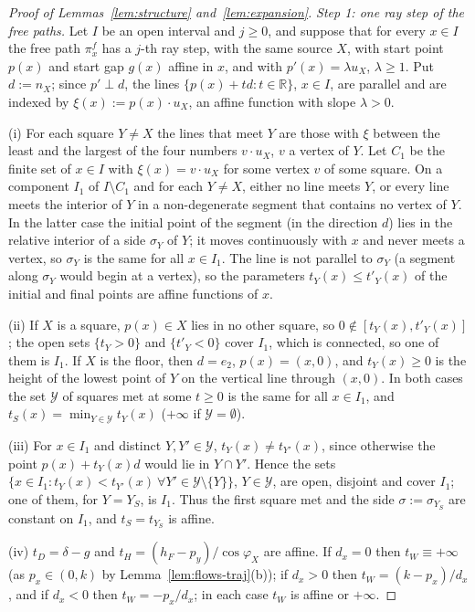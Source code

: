 \documentclass[11pt]{amsart}
\newcommand{\R}{\mathbb R}
\theoremstyle{definition}
\theoremstyle{remark}
\numberwithin{equation}{section}
\begin{document}
\begin{proof}[Proof of Lemmas~\ref{lem:structure} and~\ref{lem:expansion}]
\emph{Step 1: one ray step of the free paths.} Let $I$ be an open interval and $j\ge0$, and suppose that for every
$x\in I$ the free path $\pi^f_x$ has a $j$-th ray step, with the same source $X$, with start point $p(x)$ and start gap
$g(x)$ affine in $x$, and with $p'(x)=\lambda u_X$, $\lambda\ge1$. Put $d:=n_X$; since $p'\perp d$, the lines
$\{p(x)+td:t\in\R\}$, $x\in I$, are parallel and are indexed by $\xi(x):=p(x)\cdot u_X$, an affine function with slope
$\lambda>0$.

(i) For each square $Y\ne X$ the lines that meet $Y$ are those with $\xi$ between the least and the largest of the four
numbers $v\cdot u_X$, $v$ a vertex of $Y$. Let $C_1$ be the finite set of $x\in I$ with $\xi(x)=v\cdot u_X$ for some
vertex $v$ of some square. On a component $I_1$ of $I\setminus C_1$ and for each $Y\ne X$, either no line meets $Y$, or
every line meets the interior of $Y$ in a non-degenerate segment that contains no vertex of $Y$. In the latter case the
initial point of the segment (in the direction $d$) lies in the relative interior of a side $\sigma_Y$ of $Y$; it moves
continuously with $x$ and never meets a vertex, so $\sigma_Y$ is the same for all $x\in I_1$. The line is not parallel
to $\sigma_Y$ (a segment along $\sigma_Y$ would begin at a vertex), so the parameters $t_Y(x)\le t'_Y(x)$ of the initial
and final points are affine functions of $x$.

(ii) If $X$ is a square, $p(x)\in X$ lies in no other square, so $0\notin[t_Y(x),t'_Y(x)]$; the open sets
$\{t_Y>0\}$ and $\{t'_Y<0\}$ cover $I_1$, which is connected, so one of them is $I_1$. If $X$ is the floor, then
$d=e_2$, $p(x)=(x,0)$, and $t_Y(x)\ge0$ is the height of the lowest point of $Y$ on the vertical line through $(x,0)$.
In both cases the set $\mathcal Y$ of squares met at some $t\ge0$ is the same for all $x\in I_1$, and
$t_S(x)=\min_{Y\in\mathcal Y}t_Y(x)$ ($+\infty$ if $\mathcal Y=\emptyset$).

(iii) For $x\in I_1$ and distinct $Y,Y'\in\mathcal Y$, $t_Y(x)\ne t_{Y'}(x)$, since otherwise the point
$p(x)+t_Y(x)d$ would lie in $Y\cap Y'$. Hence the sets $\{x\in I_1:t_Y(x)<t_{Y'}(x)\ \forall Y'\in\mathcal Y\setminus\{Y\}\}$,
$Y\in\mathcal Y$, are open, disjoint and cover $I_1$; one of them, for $Y=Y_S$, is $I_1$. Thus the first square met and
the side $\sigma:=\sigma_{Y_S}$ are constant on $I_1$, and $t_S=t_{Y_S}$ is affine.

(iv) $t_D=\delta-g$ and $t_H=(h_F-p_y)/\cos\varphi_X$ are affine. If $d_x=0$ then $t_W\equiv+\infty$ (as $p_x\in(0,k)$
by Lemma~\ref{lem:flows-traj}(b)); if $d_x>0$ then $t_W=(k-p_x)/d_x$, and if $d_x<0$ then $t_W=-p_x/d_x$; in each case
$t_W$ is affine or $+\infty$.


\end{proof}
\end{document}

